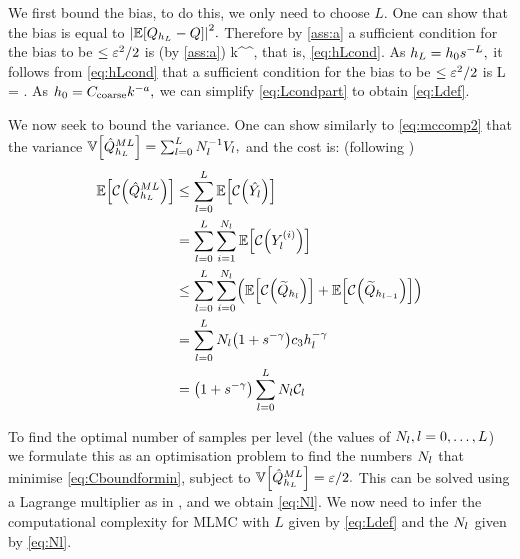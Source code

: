 We first bound the bias, to do this, we only need to choose $L.$ One can show that the bias is equal to $\abs{\EXP{\QhL - Q}}^2.$ Therefore by \cref{ass:a} a sufficient condition for the bias to be $\leq \varepsilon^2/2$ is (by \cref{ass:a})
\beqs
\co k^\sigma \hL^\alpha \leq {},
\eeqs
that is, \eqref{eq:hLcond}. As $h_{L} = h_{0} s^{-L},$ it follows from \eqref{eq:hLcond} that a sufficient condition for the bias to be $\leq \varepsilon^2/2$ is
\beq\label{eq:Lcondpart}
L = .
\eeq
As $h_{0} = C_{\mathrm{coarse}} k^{-a},$ we can simplify \eqref{eq:Lcondpart} to obtain \eqref{eq:Ldef}.

We now seek to bound the variance. One can show similarly to \cref{eq:mccomp2} that the variance $\VAR{\QhatMLhL} = \sum_{l=0}^L \Nl^{-1} \Vl,$ and the cost is: (following \cite{GrPaSc:19})
\begin{align}
\EXP{\Cost{\QhatMLhL}}&\leq \sum_{l=0}^L \EXP{\Cost{\Ylhat}}\nonumber\\
&= \sum_{l=0}^L \sum_{i=1}^{\Nl} \EXP{\Cost{\Yli}}\nonumber\\
&\leq \sum_{l=0}^L \sum_{i=0}^{\Nl} \mleft(\EXP{\Cost{\Qhltilde}} + \EXP{\Cost{\Qhlmotilde}}\mright)\nonumber\\
&=\sum_{l=0}^L \Nl\mleft(1+s^{-\gamma}\mright) \cth \hl^{-\gamma}\nonumber\\
&= \mleft(1+s^{-\gamma}\mright) \sum_{l=0}^L \Nl\Cl\label{eq:Cboundformin}
\end{align}

To find the optimal number of samples per level (the values of $N_{l}, l=0,\ldots,L$) we formulate this as an optimisation problem to find the numbers $N_{l}$ that minimise \eqref{eq:Cboundformin}, subject to $\VAR{\QhatMLhL}=\eps/2.$ This can be solved using a Lagrange multiplier as in \cite{Gi:15}, and we obtain \cref{eq:Nl}. We now need to infer the computational complexity for MLMC with $L$ given by \eqref{eq:Ldef} and the $N_{l}$ given by \eqref{eq:Nl}.


